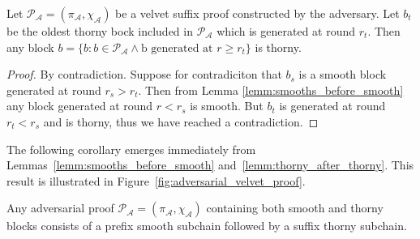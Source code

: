 \begin{lemma}
	Let $\mathcal{P_A} = (\pi_\mathcal{A}, \chi_\mathcal{A})$ be a velvet suffix proof constructed by the adversary. Let $b_t$ be the oldest thorny bock included in $\mathcal{P_A}$ which is generated at round $r_t$. Then any block $b = \{b: b \in \mathcal{P_A} \wedge \text{b generated at }r \geq r_t \}$ is thorny.
	\label{lemm:thorny_after_thorny}
\end{lemma}
\begin{proof}
By contradiction. Suppose for contradiciton that $b_s$ is a smooth block generated at round $r_s > r_t$. Then from Lemma \ref{lemm:smooths_before_smooth} any block generated at round $r < r_s$ is smooth. But $b_t$ is generated at round $r_t < r_s$ and is thorny, thus we have reached a contradiction.
\end{proof}

The following corollary emerges immediately from Lemmas~\ref{lemm:smooths_before_smooth} and~\ref{lemm:thorny_after_thorny}. This result is illustrated in Figure~\ref{fig:adversarial_velvet_proof}.

\begin{corollary}
	Any adversarial proof $\mathcal{P_A} = (\pi_\mathcal{A}, \chi_\mathcal{A})$ containing both smooth and thorny blocks consists of a prefix smooth subchain followed by a suffix thorny subchain.
	\label{cor:adversarial_proof_scheme}
\end{corollary}

